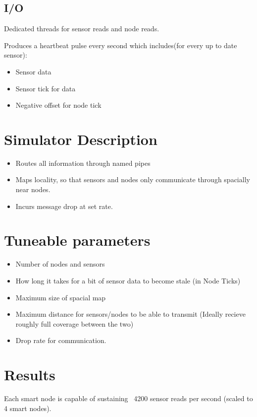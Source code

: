 \documentclass{article}
\begin{document}
\subsection{I/O}
	Dedicated threads for sensor reads and node reads.

	Produces a heartbeat pulse every second which includes(for every up to date sensor):
\begin{itemize}
	\item Sensor data
	\item Sensor tick for data
	\item Negative offset for node tick
\end{itemize}
	
\newpage

\section{Simulator Description}
\begin{itemize}
	\item Routes all information through named pipes
	\item Maps locality, so that sensors and nodes only communicate through spacially near nodes. %
	\item Incurs message drop at set rate.
\end{itemize}

\newpage

\section{Tuneable parameters}
\begin{itemize}
	\item Number of nodes and sensors %
	\item How long it takes for a bit of sensor data to become stale (in Node Ticks) %
	\item Maximum size of spacial map
	\item	Maximum distance for sensors/nodes to be able to transmit	(Ideally recieve roughly full coverage between the two)
	\item	Drop rate for communication.
\end{itemize}

\newpage
\section{Results}
	Each smart node is capable of sustaining ~4200 sensor reads per second (scaled to 4 smart nodes).
	
\end{document}
